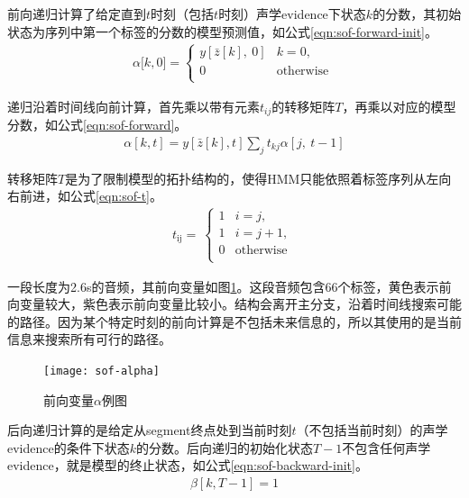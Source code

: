 {前向递归计算了给定直到$t$时刻（包括$t$时刻）声学evidence下状态$k$的分数，其初始状态为序列中第一个标签的分数的模型预测值，如公式\ref{eqn:sof-forward-init}。
\begin{align}
\label{eqn:sof-forward-init}
\alpha\lbrack k,0\rbrack = \left\{ 
\begin{matrix} 
y\left\lbrack \bar{z}[k],\ 0 \right\rbrack & k = 0, \\ 
0 & \text{otherwise} \\ 
\end{matrix} \right.\
\end{align}

递归沿着时间线向前计算，首先乘以带有元素$t_{ij}$的转移矩阵$T$，再乘以对应的模型分数，如公式\ref{eqn:sof-forward}。
\begin{align}
\label{eqn:sof-forward}
\alpha\left\lbrack k,t \right\rbrack = y\left\lbrack \bar{z}[k],t \right\rbrack\sum_{j}^{}{t_{kj}\alpha\left\lbrack j,\ t - 1 \right\rbrack}
\end{align}

转移矩阵$T$是为了限制模型的拓扑结构的，使得HMM只能依照着标签序列从左向右前进，如公式\ref{eqn:sof-t}。
\begin{align}
\label{eqn:sof-t}
t_{\text{ij}} = \ \left\{ 
\begin{matrix} 
1 & i = j, \\ 1 & i = j + 1, \\ 
0 & \text{otherwise} \\ 
\end{matrix} \right.\
\end{align}

一段长度为2.6s的音频，其前向变量如图\ref{fig:sof-alpha}。这段音频包含66个标签，黄色表示前向变量较大，紫色表示前向变量比较小。结构会离开主分支，沿着时间线搜索可能的路径。因为某个特定时刻的前向计算是不包括未来信息的，所以其使用的是当前信息来搜索所有可行的路径。
\begin{figure}[htbp]
  \centering
  \texttt{[image: sof-alpha]}
  \caption{前向变量$\alpha$例图 \label{fig:sof-alpha}}
\end{figure}

后向递归计算的是给定从segment终点处到当前时刻$t$（不包括当前时刻）的声学evidence的条件下状态$k$的分数。后向递归的初始化状态$T-1$不包含任何声学evidence，就是模型的终止状态，如公式\ref{eqn:sof-backward-init}。
\begin{align}
\label{eqn:sof-backward-init}
	\beta\left\lbrack k,T - 1 \right\rbrack = 1
\end{align}

}
